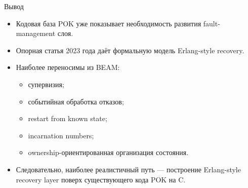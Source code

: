 \begin{frame}{Вывод}
	\begin{itemize}
		\item Кодовая база POK уже показывает необходимость развития fault-management слоя.
		\item Опорная статья 2023 года даёт формальную модель Erlang-style recovery.
		\item Наиболее переносимы из BEAM:
		\begin{itemize}
			\item супервизия;
			\item событийная обработка отказов;
			\item restart from known state;
			\item incarnation numbers;
			\item ownership-ориентированная организация состояния.
		\end{itemize}
		\item Следовательно, наиболее реалистичный путь --- построение Erlang-style recovery layer поверх существующего кода POK на C.
	\end{itemize}
\end{frame}